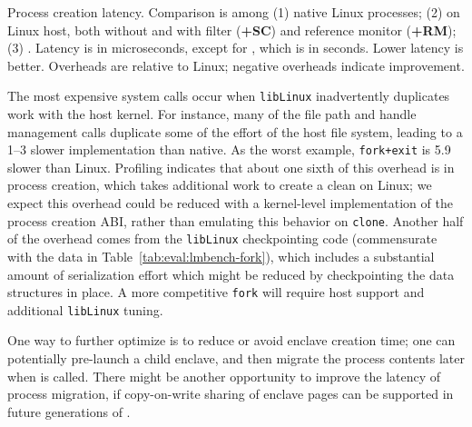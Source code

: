 

\begin{table}[t!b!]

\caption{Process creation latency. Comparison is among (1) native Linux processes; (2) \graphene{} on Linux host, both without and with \seccomp{} filter ({\bf +SC}) and reference monitor ({\bf +RM}); (3) \graphenesgx{}.
Latency is in microseconds, except for \graphenesgx{}, which is in seconds. Lower latency is better.
Overheads are relative to Linux; negative overheads indicate improvement.} 
\label{tab:eval:lmbench-fork}
\end{table}


The most expensive system calls occur when {\tt libLinux} inadvertently duplicates work
with the host kernel.  
For instance, many of the file path and handle management calls duplicate some of the effort of the host file system,
leading to a 1--3\x{} slower implementation than native.
As the worst example,
{\tt fork+exit} is 5.9\x{} slower than Linux.
Profiling indicates that about one sixth of this overhead is in process creation, which 
takes additional work to create a clean \picoproc{} on Linux; we expect this overhead could be reduced
with a kernel-level implementation of the process creation ABI, rather than emulating this behavior on {\tt clone}.
Another half of the overhead comes from the
{\tt libLinux} checkpointing code (commensurate with the data in Table~\ref{tab:eval:lmbench-fork}), which 
includes a substantial amount of serialization effort which might be reduced by checkpointing the data structures in place.
A more competitive {\tt fork} will require host support and additional {\tt libLinux} tuning.


One way to further optimize  is to reduce or avoid enclave creation time; one can potentially pre-launch a child enclave, and then migrate the process contents later when  is called.
There might be another opportunity to improve the latency of process migration,
if copy-on-write sharing of enclave pages can be supported in future generations of \sgx{}.



